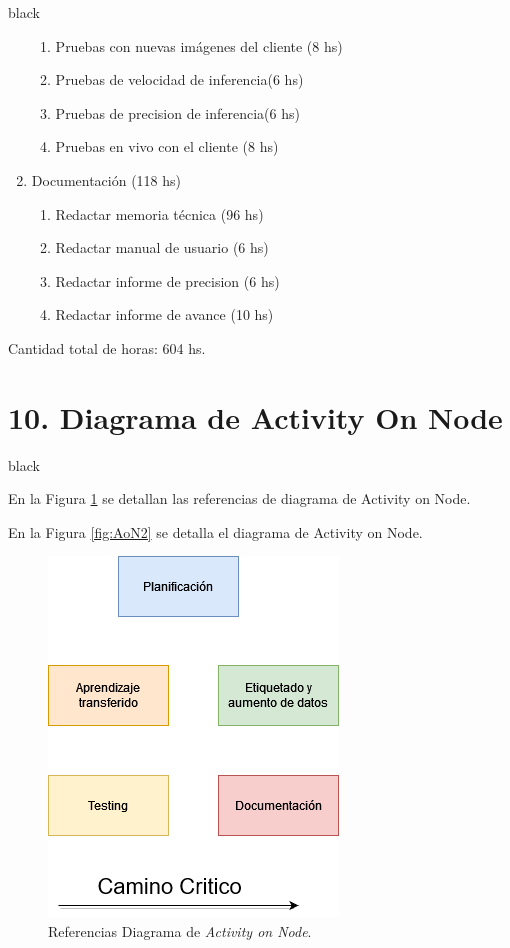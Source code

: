 \documentclass[
11pt, %
]{charter}
\begin{document}
\begin{consigna}{black}
\begin{enumerate}
\begin{enumerate}
	\item Pruebas con nuevas imágenes del cliente (8 hs)
	\item Pruebas de velocidad de inferencia(6 hs)
	\item Pruebas de precision de inferencia(6 hs)
	\item Pruebas en vivo con el cliente (8 hs)
	\end{enumerate}
\item Documentación (118 hs)
	\begin{enumerate}
	\item Redactar memoria técnica (96 hs)
	\item Redactar manual de usuario (6 hs)
	\item Redactar informe de precision (6 hs)
	\item Redactar informe de avance (10 hs)
	\end{enumerate}
\end{enumerate}

Cantidad total de horas: 604 hs.


\end{consigna}

\section{10. Diagrama de Activity On Node}
\label{sec:AoN}

\begin{consigna}{black}

En la Figura \ref{fig:AoN} se detallan las referencias de diagrama de Activity on Node.

En la Figura \ref{fig:AoN2} se detalla el diagrama de Activity on Node.



\end{consigna}

\begin{figure}[htpb]
\centering 
\includegraphics[width=.45\textwidth]{./Figuras/Aon referencias.png}
\caption{Referencias Diagrama de \textit{Activity on Node}.}
\label{fig:AoN}
\end{figure}
\end{document}
